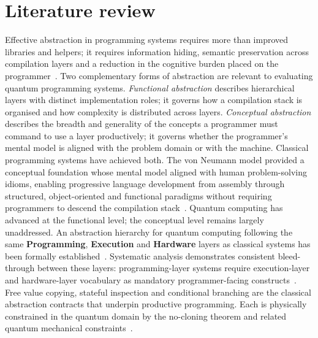 \section{Literature review}\label{sec:pre_confirmation:literature_review}
Effective abstraction in programming systems requires more than improved libraries and helpers; it requires information hiding, semantic preservation across compilation layers and a reduction in the cognitive burden placed on the programmer~\cite{parnas1972criteria, DiMatteo2024AbstractionHierarchy, yuan2025foundationalabstractions}.
Two complementary forms of abstraction are relevant to evaluating quantum programming systems.
\textit{Functional abstraction} describes hierarchical layers with distinct implementation roles; it governs how a compilation stack is organised and how complexity is distributed across layers.
\textit{Conceptual abstraction} describes the breadth and generality of the concepts a programmer must command to use a layer productively; it governs whether the programmer's mental model is aligned with the problem domain or with the machine.
Classical programming systems have achieved both.
The von Neumann model provided a conceptual foundation whose mental model aligned with human problem-solving idioms, enabling progressive language development from assembly through structured, object-oriented and functional paradigms without requiring programmers to descend the compilation stack~\cite{abelson1996sicp, nunez_corrales2025betterabstractmachines}.
Quantum computing has advanced at the functional level; the conceptual level remains largely unaddressed.
An abstraction hierarchy for quantum computing following the same \textbf{Programming}, \textbf{Execution} and \textbf{Hardware} layers as classical systems has been formally established~\cite{DiMatteo2024AbstractionHierarchy}.
Systematic analysis demonstrates consistent bleed-through between these layers: programming-layer systems require execution-layer and hardware-layer vocabulary as mandatory programmer-facing constructs~\cite{DiMatteo2024AbstractionHierarchy}.
Free value copying, stateful inspection and conditional branching are the classical abstraction contracts that underpin productive programming.
Each is physically constrained in the quantum domain by the no-cloning theorem and related quantum mechanical constraints~\cite{yuan2025foundationalabstractions}.

